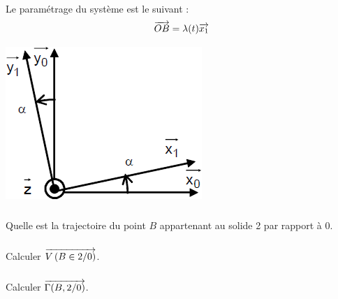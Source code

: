 \documentclass[10pt,oneside]{article}
\begin{document}
\begin{minipage}[c]{.45\linewidth}
Le paramétrage du système est le suivant :
$$
\overrightarrow{OB} = \lambda(t) \overrightarrow{x_1}
$$
\end{minipage}\hfill
\begin{minipage}[c]{.45\linewidth}
\begin{center}
\includegraphics[width=.45\textwidth]{png/parametrage}
\end{center}
\end{minipage}



\subparagraph{}
Quelle est la trajectoire du point $B$ appartenant au solide 2 par rapport à 0.

\subparagraph{}
Calculer $\overrightarrow{V\left( {B} \in {2}/{0}\right)}$.

\subparagraph{}
Calculer $\overrightarrow{\Gamma(B,2/0)}$.

\end{document}
